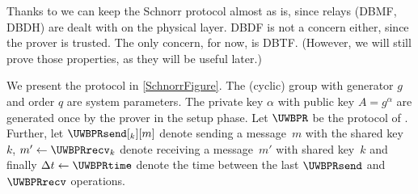 Thanks to \textcite{UWBPR} we can keep the Schnorr protocol almost as is, since 
relays (\ac{DBMF}, \ac{DBDH}) are dealt with on the physical layer.
\Ac{DBDF} is not a concern either, since the prover is trusted.
The only concern, for now, is \acl{DBTF}.
(However, we will still prove those properties, as they will be useful later.)

We present the protocol in \cref{SchnorrFigure}.
The (cyclic) group with generator \(g\) and order \(q\) are system parameters.
The private key \(\alpha\) with public key \(A = g^\alpha\) are generated once by the prover in the setup phase.
Let \(\UWBPR\) be the protocol of \textcite{UWBPR}.
Further, let
\(\UWBPRsend[_k][m]\) denote sending a message~\(m\) with the shared key~\(k\),
\(m'\gets \UWBPRrecv_k\) denote receiving a message~\(m'\) with shared 
key~\(k\) and finally
\(\Delta t\gets \UWBPRtime\) denote the time between the last \(\UWBPRsend\) 
and \(\UWBPRrecv\) operations.

